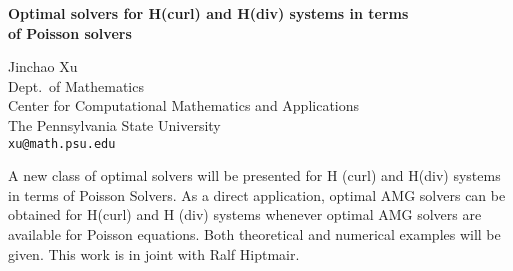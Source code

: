\documentclass{report}
\begin{document}

\begin{center}
{\large
{\bf Optimal solvers for H(curl) and H(div) systems in terms \\
	of Poisson solvers}}

	Jinchao Xu \\
	Dept.~of Mathematics \\
	Center for Computational Mathematics and Applications \\
	The Pennsylvania State University \\
	{\tt xu@math.psu.edu}
\end{center}
A new class of optimal solvers
will be presented for H (curl) and H(div) systems in terms of
Poisson Solvers. As a direct application, optimal AMG solvers can
be obtained for H(curl) and H (div) systems whenever optimal AMG
solvers are available for Poisson equations. Both theoretical and
numerical examples will be given. This work is in joint with Ralf
Hiptmair.



\end{document}
